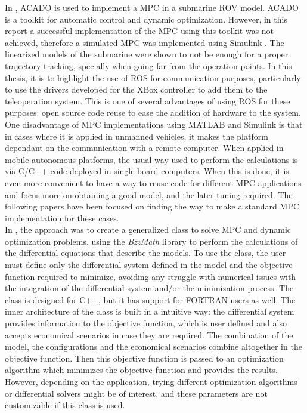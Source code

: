 In \cite{Johansson2012}, ACADO is used to implement a MPC in a submarine ROV model. ACADO is a toolkit for automatic control and dynamic optimization. However, in this report a successful implementation of the MPC using this toolkit was not achieved, therefore a simulated MPC was implemented using Simulink \textsuperscript{\textregistered}. The linearized models of the submarine were shown to not be enough for a proper trajectory tracking, specially when going far from the operation points. In this thesis, it is to highlight the use of ROS for communication purposes, particularly to use the drivers developed for the XBox controller to add them to the teleoperation system. This is one of several advantages of using ROS for these purposes: open source code reuse to ease the addition of hardware to the system.\\

One disadvantage of MPC implementations using MATLAB \textsuperscript{\textregistered} and Simulink \textsuperscript{\textregistered} is that in cases where it is applied in unmanned vehicles, it makes the platform dependant on the communication with a remote computer. When applied in mobile autonomous platforms, the usual way used to perform the calculations is via C/C++ code deployed in single board computers. When this is done, it is even more convenient to have a way to reuse code for different MPC applications and focus more on obtaining a good model, and the later tuning required. The following papers have been focused on finding the way to make a standard MPC implementation for these cases. \\

In \cite{Manenti2008}, the approach was to create a generalized class to solve MPC and dynamic optimization problems, using the \emph{BzzMath} library to perform the calculations of the differential equations that describe the models. To use the class, the user must define only the differential system defined in the model and the objective function required to minimize, avoiding any struggle with numerical issues with the integration of the differential system and/or the minimization process. The class is designed for C++, but it has support for FORTRAN users as well. The inner architecture of the class is built in a intuitive way: the differential system provides information to the objective function, which is user defined and also accepts economical scenarios in case they are required. The combination of the model, the configurations and the economical scenarios combine altogether in the objective function. Then this objective function is passed to an optimization algorithm which minimizes the objective function and provides the results. However, depending on the application, trying different optimization algorithms or differential solvers might be of interest, and these parameters are not customizable if this class is used.\\

